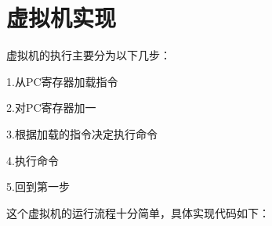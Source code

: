 \section{虚拟机实现}

虚拟机的执行主要分为以下几步：

1.从PC寄存器加载指令

2.对PC寄存器加一

3.根据加载的指令决定执行命令

4.执行命令

5.回到第一步

这个虚拟机的运行流程十分简单，具体实现代码如下：

% 

% 

% 


